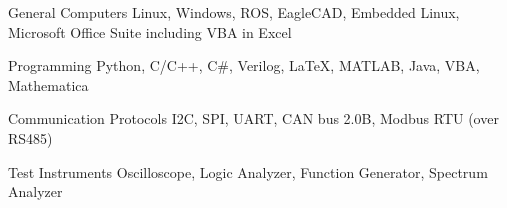

\begin{cvskills}

  \cvskill
    {General Computers} %
    {Linux, Windows, ROS, EagleCAD, Embedded Linux, Microsoft Office Suite including VBA in Excel} %

  \cvskill
    {Programming} %
    {Python, C/C++, C\#, Verilog, LaTeX, MATLAB, Java, VBA, Mathematica} %

  \cvskill
    {Communication Protocols} %
    {I2C, SPI, UART, CAN bus 2.0B, Modbus RTU (over RS485)} %

  \cvskill
    {Test Instruments} %
    {Oscilloscope, Logic Analyzer, Function Generator, Spectrum Analyzer} %

\end{cvskills}
